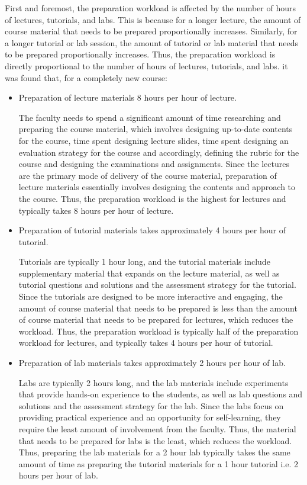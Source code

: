 First and foremost, the preparation workload is affected by the number of hours of lectures, tutorials, and labs. This is because for a longer lecture, the amount of course material that needs to be prepared proportionally increases. Similarly, for a longer tutorial or lab session, the amount of tutorial or lab material that needs to be prepared proportionally increases. Thus, the preparation workload is directly proportional to the number of hours of lectures, tutorials, and labs. it was found that, for a completely new course:

\begin{itemize}
  \item Preparation of lecture materials 8 hours per hour of lecture.

        The faculty needs to spend a significant amount of time researching and preparing the course material, which involves designing up-to-date contents for the course, time spent designing lecture slides, time spent designing an evaluation strategy for the course and accordingly, defining the rubric for the course and designing the examinations and assignments. Since the lectures are the primary mode of delivery of the course material, preparation of lecture materials essentially involves designing the contents and approach to the course. Thus, the preparation workload is the highest for lectures and typically takes 8 hours per hour of lecture.


  \item Preparation of tutorial materials takes approximately 4 hours per hour of tutorial.

        Tutorials are typically 1 hour long, and the tutorial materials include supplementary material that expands on the lecture material, as well as tutorial questions and solutions and the assessment strategy for the tutorial. Since the tutorials are designed to be more interactive and engaging, the amount of course material that needs to be prepared is less than the amount of course material that needs to be prepared for lectures, which reduces the workload. Thus, the preparation workload is typically half of the preparation workload for lectures, and typically takes 4 hours per hour of tutorial.

  \item Preparation of lab materials takes approximately 2 hours per hour of lab.

        Labs are typically 2 hours long, and the lab materials include experiments that provide hands-on experience to the students, as well as lab questions and solutions and the assessment strategy for the lab. Since the labs focus on providing practical experience and an opportunity for self-learning, they require the least amount of involvement from the faculty. Thus, the material that needs to be prepared for labs is the least, which reduces the workload. Thus, preparing the lab materials for a 2 hour lab typically takes the same amount of time as preparing the tutorial materials for a 1 hour tutorial i.e. 2 hours per hour of lab.
\end{itemize}


